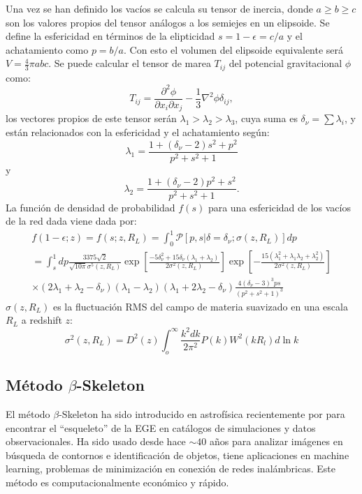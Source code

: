 \documentclass[preprint]{aastex62}
\begin{document}
  Una vez se han definido los vacíos se calcula su tensor de inercia, donde $a \geq b \geq c$ son los
  valores propios del tensor análogos a los semiejes en un elipsoide. Se define la esfericidad en
  términos de la elipticidad $s = 1 - \epsilon = c / a$ y el achatamiento como $ p = b / a$. Con esto
  el volumen del elipsoide equivalente será $V = \frac{4}{3}\pi abc$. Se puede calcular el tensor de
  marea $T_{ij}$ del potencial gravitacional $\phi$ como:
  \begin{equation}
    T_{ij} = \frac{\partial^2 \phi}{\partial x_i \partial x_j} - \frac{1}{3} \nabla^2 \phi \delta_{ij},
  \end{equation}
  los vectores propios de este tensor serán  $\lambda_1 > \lambda_2 > \lambda_3$, cuya suma es
  $\delta_\nu = \sum \lambda_i$, y están relacionados con la esfericidad y el achatamiento según:
  \begin{equation}
    \lambda_1 = \frac{1 + (\delta_\nu -2)s^2 + p^2}{p^2 + s^2 + 1}
 \end{equation}
  y  
  \begin{equation}
    \lambda_2 = \frac{1 + (\delta_\nu -2)p^2 + s^2}{p^2 + s^2 + 1}.
  \end{equation}
  La función de densidad de probabilidad $f(s)$ para una esfericidad de los vacíos de la red dada viene dada por:
  \begin{eqnarray}
    f(1-\epsilon;z) = f(s;z, R_L) = \int_0^1 \mathcal{P}\left[ p,s|\delta = \delta_\nu;\sigma(z,R_L)\right] dp \nonumber\\
    = \int_s^1 dp \frac{3375 \sqrt{2}}{ \sqrt{10 \pi} \sigma^5(z,R_L)}
      \exp \left[ \frac{-5 \delta_\nu^2 + 15 \delta_\nu ( \lambda_1 + \lambda_2 )}{2 \sigma^2(z,R_L)} \right] 
      \exp \left[ - \frac{ 15(\lambda_1^2 + \lambda_1 \lambda_2 + \lambda_2^2)}{ 2\sigma^2(z,R_L)}\right] \\
      \times (2\lambda_1 + \lambda_2 - \delta_\nu) 
       (\lambda_1 - \lambda_2)( \lambda_1 + 2\lambda_2 - \delta_\nu) \frac{ 4 (\delta_\nu - 3)^3 p s }{ ( p^2 + s^2 + 1)^3}
  \end{eqnarray}
  $\sigma(z,R_L)$ es la fluctuación RMS del campo de materia suavizado en una escala $R_L$ a
  redshift $z$:
  \begin{equation}
    \sigma^2(z,R_L) = D^2(z) \int_o^{\infty} \frac{k^2dk}{2\pi^2}P(k) W^2(kR_l)d \ln k
  \end{equation}
  \subsection{Método $\beta$-Skeleton}
  El método $\beta$-Skeleton ha sido introducido en astrofísica recientemente por \citet{Fang2018} para
  encontrar el ``esqueleto'' de la  EGE en catálogos de simulaciones y datos observacionales.
  Ha sido usado desde hace $\sim 40$ años para analizar imágenes en búsqueda de contornos e identificación
  de objetos, tiene aplicaciones en machine learning, problemas de minimización en conexión de redes
  inalámbricas. Este método es computacionalmente económico y rápido.
  
\end{document}
